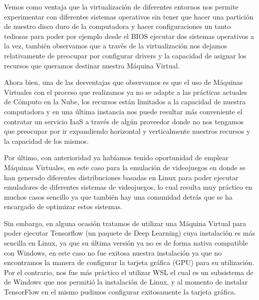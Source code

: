 \documentclass[12pt,a4paper]{article}
\begin{document}
\vspace{1em}

Vemos como ventaja que la virtualización de diferentes entornos nos permite experimentar con diferentes sistemas operativos sin tener que hacer una partición de nuestro disco duro de la computadora y hacer configuraciones un tanto tediosas para poder por ejemplo desde el BIOS ejecutar dos sistemas operativos a la vez, también observamos que a través de la virtualización nos dejamos relativamente de preocupar por configurar drivers y la capacidad de asignar los recursos que queramos destinar nuestra Máquina Virtual.

\vspace{1em}

Ahora bien, una de las desventajas que observamos es que el uso de Máquinas Virtuales con el proceso que realizamos ya no se adapte a las prácticas actuales de Cómputo en la Nube, los recursos están limitados a la capacidad de nuestra computadora y en una última instancia nos puede resultar más conveniente el contratar un servicio IaaS a través de algún proveedor donde no nos tengamos que preocupar por ir expandiendo horizontal y verticalmente nuestros recursos y la capacidad de los mismos.

\vspace{1em}

Por último, con anterioridad ya habíamos tenido oportunidad de emplear Máquinas Virtuales, en este caso para la emulación de videojuegos en donde se han generado diferentes distribuciones basadas en Linux para poder ejecutar emuladores de diferentes sistemas de videojuegos, lo cual resulta muy práctico en muchos casos sencillo ya que también hay una comunidad detrás que se ha encargado de optimizar estos sistemas.

\vspace{1em}

Sin embargo, en alguna ocasión tratamos de utilizar una Máquina Virtual para poder ejecutar Tensorflow (un paquete de Deep Learning) cuya instalación es más sencilla en Linux, ya que su última versión ya no es de forma nativa compatible con Windows, en este caso no fue exitosa nuestra instalación ya que no encontramos la manera de configurar la tarjeta gráfica (GPU) para su utilización. Por el contrario, nos fue más práctico el utilizar WSL el cual es un subsistema de de Windows que nos permitió la instalación de Linux, y al momento de instalar TensorFlow en el mismo pudimos configurar exitosamente la tarjeta gráfica.


\vspace{1em}
\end{document}
